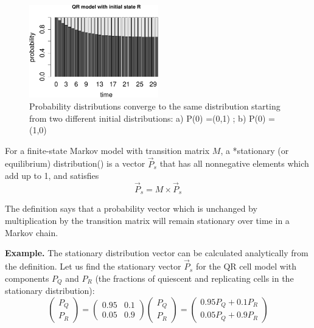 \documentclass[
  letterpaper,
  DIV=11,
  numbers=noendperiod]{scrreprt}
\begin{document}
\begin{figure}

{\centering \includegraphics[width=0.5\textwidth,height=\textheight]{./markov_stat_files/figure-pdf/stat-mark-2.pdf}

}

\caption{Probability distributions converge to the same distribution
starting from two different initial distributions: a) P(0) =(0,1) ; b)
P(0) =(1,0)}

\end{figure}

\begin{tcolorbox}[enhanced jigsaw, arc=.35mm, colframe=quarto-callout-note-color-frame, left=2mm, opacitybacktitle=0.6, breakable, title=\textcolor{quarto-callout-note-color}{\faInfo}\hspace{0.5em}{Definition}, toprule=.15mm, coltitle=black, bottomtitle=1mm, toptitle=1mm, colback=white, leftrule=.75mm, colbacktitle=quarto-callout-note-color!10!white, titlerule=0mm, opacityback=0, rightrule=.15mm, bottomrule=.15mm]

For a finite-state Markov model with transition matrix \(M\), a
*stationary (or equilibrium) distribution() is a vector \(\vec P_s\)
that has all nonnegative elements which add up to 1, and satisfies
\[ \vec P_s = M \times  \vec P_s\]

\end{tcolorbox}

The definition says that a probability vector which is unchanged by
multiplication by the transition matrix will remain stationary over time
in a Markov chain. \cite{feller_introduction_????}

\textbf{Example.} The stationary distribution vector can be calculated
analytically from the definition. Let us find the stationary vector
\(\vec P_s\) for the QR cell model with components \(P_Q\) and \(P_R\)
(the fractions of quiescent and replicating cells in the stationary
distribution):
\[  \left(\begin{array}{c} P_Q  \\ P_R \end{array} \right) =\left(\begin{array}{cc}0.95 & 0.1 \\0.05 & 0.9\end{array}\right)  \left(\begin{array}{c} P_Q  \\ P_R \end{array}\right) =  \left(\begin{array}{c}0.95P_Q + 0.1P_R \\0.05P_Q + 0.9P_R \end{array}\right) \]
\end{document}
